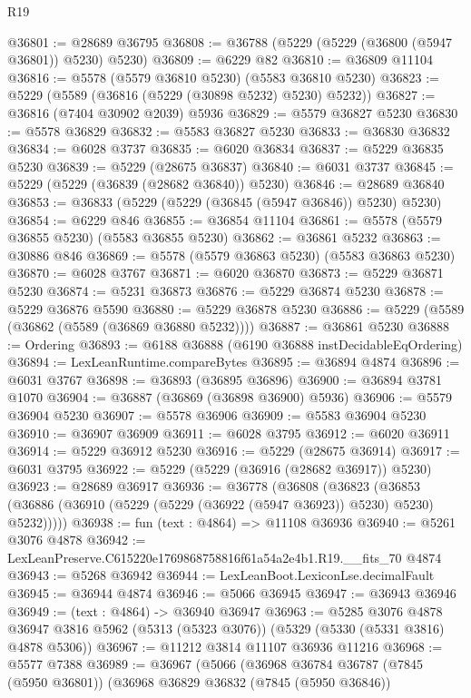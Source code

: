 \begin{lexlean}{R19}
\begin{coremodule}
@36801 := @28689 @36795
@36808 := @36788 (@5229 (@5229 (@36800 (@5947 @36801)) @5230) @5230)
@36809 := @6229 @82
@36810 := @36809 @11104
@36816 := @5578 (@5579 @36810 @5230) (@5583 @36810 @5230)
@36823 := @5229 (@5589 (@36816 (@5229 (@30898 @5232) @5230) @5232))
@36827 := @36816 (@7404 @30902 @2039) @5936
@36829 := @5579 @36827 @5230
@36830 := @5578 @36829
@36832 := @5583 @36827 @5230
@36833 := @36830 @36832
@36834 := @6028 @3737
@36835 := @6020 @36834
@36837 := @5229 @36835 @5230
@36839 := @5229 (@28675 @36837)
@36840 := @6031 @3737
@36845 := @5229 (@5229 (@36839 (@28682 @36840)) @5230)
@36846 := @28689 @36840
@36853 := @36833 (@5229 (@5229 (@36845 (@5947 @36846)) @5230) @5230)
@36854 := @6229 @846
@36855 := @36854 @11104
@36861 := @5578 (@5579 @36855 @5230) (@5583 @36855 @5230)
@36862 := @36861 @5232
@36863 := @30886 @846
@36869 := @5578 (@5579 @36863 @5230) (@5583 @36863 @5230)
@36870 := @6028 @3767
@36871 := @6020 @36870
@36873 := @5229 @36871 @5230
@36874 := @5231 @36873
@36876 := @5229 @36874 @5230
@36878 := @5229 @36876 @5590
@36880 := @5229 @36878 @5230
@36886 := @5229 (@5589 (@36862 (@5589 (@36869 @36880 @5232))))
@36887 := @36861 @5230
@36888 := Ordering
@36893 := @6188 @36888 (@6190 @36888 instDecidableEqOrdering)
@36894 := LexLeanRuntime.compareBytes
@36895 := @36894 @4874
@36896 := @6031 @3767
@36898 := @36893 (@36895 @36896)
@36900 := @36894 @3781 @1070
@36904 := @36887 (@36869 (@36898 @36900) @5936)
@36906 := @5579 @36904 @5230
@36907 := @5578 @36906
@36909 := @5583 @36904 @5230
@36910 := @36907 @36909
@36911 := @6028 @3795
@36912 := @6020 @36911
@36914 := @5229 @36912 @5230
@36916 := @5229 (@28675 @36914)
@36917 := @6031 @3795
@36922 := @5229 (@5229 (@36916 (@28682 @36917)) @5230)
@36923 := @28689 @36917
@36936 := @36778
    (@36808
      (@36823 (@36853 (@36886 (@36910 (@5229 (@5229 (@36922 (@5947 @36923)) @5230) @5230) @5232)))))
@36938 := fun (text : @4864) => @11108 @36936
@36940 := @5261 @3076 @4878
@36942 := LexLeanPreserve.C615220e1769868758816f61a54a2e4b1.R19.__fits_70 @4874
@36943 := @5268 @36942
@36944 := LexLeanBoot.LexiconLse.decimalFault
@36945 := @36944 @4874
@36946 := @5066 @36945
@36947 := @36943 @36946
@36949 := (text : @4864) -> @36940 @36947
@36963 := @5285
    @3076
    @4878
    @36947
    @3816
    @5962
    (@5313 (@5323 @3076))
    (@5329 (@5330 (@5331 @3816) @4878 @5306))
@36967 := @11212 @3814 @11107 @36936 @11216
@36968 := @5577 @7388
@36989 := @36967
    (@5066
      (@36968
        @36784
        @36787
        (@7845 (@5950 @36801))
        (@36968
          @36829
          @36832
          (@7845 (@5950 @36846))

\end{coremodule}
\end{lexlean}
